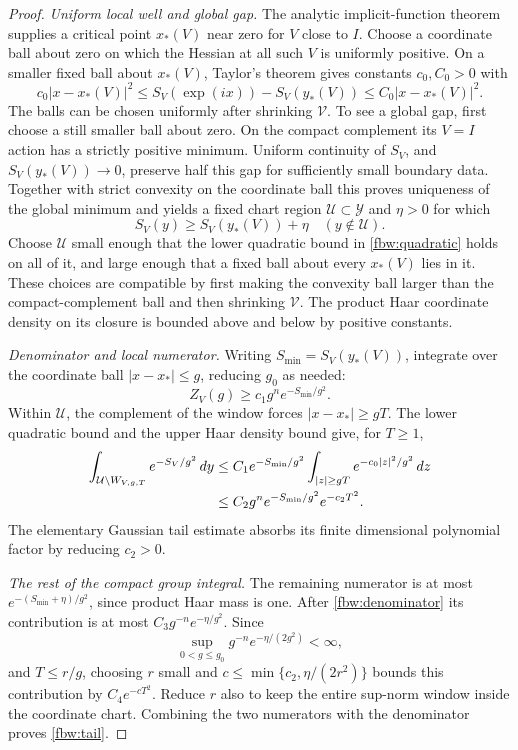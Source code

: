 \begin{proof}
\emph{Uniform local well and global gap.}
The analytic implicit-function theorem supplies a critical point
\(x_*(V)\) near zero for \(V\) close to \(I\). Choose a coordinate
ball about zero on which the Hessian at all such \(V\) is uniformly
positive. On a smaller fixed ball about \(x_*(V)\), Taylor's theorem
gives constants \(c_0,C_0>0\) with
\begin{equation}
 c_0|x-x_*(V)|^2\leq S_V(\exp(ix))-S_V(y_*(V))
       \leq C_0|x-x_*(V)|^2.
 \label{fbw:quadratic}
\end{equation}
The balls can be chosen uniformly after shrinking \(\mathcal V\).
To see a global gap, first choose a still smaller ball about zero.
On the compact complement its \(V=I\) action has a strictly positive
minimum. Uniform continuity of \(S_V\), and \(S_V(y_*(V))\to0\),
preserve half this gap for sufficiently small boundary data.
Together with strict convexity on the coordinate ball this proves
uniqueness of the global minimum and yields a fixed chart region
\(\mathcal U\subset\mathcal Y\) and \(\eta>0\) for which
\begin{equation}
 S_V(y)\geq S_V(y_*(V))+\eta\quad(y\notin\mathcal U).
 \label{fbw:gap}
\end{equation}
Choose \(\mathcal U\) small enough that the lower quadratic bound in
\eqref{fbw:quadratic} holds on all of it, and large enough that a
fixed ball about every \(x_*(V)\) lies in it. These choices are
compatible by first making the convexity ball larger than the
compact-complement ball and then shrinking \(\mathcal V\).
The product Haar coordinate density on its closure is bounded above
and below by positive constants.

\emph{Denominator and local numerator.}
Writing \(S_{\min}=S_V(y_*(V))\), integrate over the coordinate
ball \(|x-x_*|\leq g\), reducing \(g_0\) as needed:
\begin{equation}
 Z_V(g)\geq c_1 g^n e^{-S_{\min}/g^2}.
 \label{fbw:denominator}
\end{equation}
Within \(\mathcal U\), the complement of the window forces
\(|x-x_*|\geq gT\). The lower quadratic bound and the upper Haar
density bound give, for \(T\geq1\),
\begin{align}
 \int_{\mathcal U\setminus W_{V,g,T}}e^{-S_V/g^2}\,dy
 &\leq C_1 e^{-S_{\min}/g^2}
       \int_{|z|\geq gT}e^{-c_0|z|^2/g^2}\,dz \notag\\
 &\leq C_2 g^n e^{-S_{\min}/g^2}e^{-c_2T^2}.
 \label{fbw:localnumerator}
\end{align}
The elementary Gaussian tail estimate absorbs its finite dimensional
polynomial factor by reducing \(c_2>0\).

\emph{The rest of the compact group integral.}
The remaining numerator is at most
\(e^{-(S_{\min}+\eta)/g^2}\), since product Haar mass is one.
After \eqref{fbw:denominator} its contribution is at most
\(C_3g^{-n}e^{-\eta/g^2}\). Since
\[
 \sup_{0<g\leq g_0}g^{-n}e^{-\eta/(2g^2)}<\infty,
\]
and \(T\leq r/g\), choosing \(r\) small and
\(c\leq \min\{c_2,\eta/(2r^2)\}\) bounds this contribution by
\(C_4e^{-cT^2}\). Reduce \(r\) also to keep the entire sup-norm
window inside the coordinate chart. Combining the two numerators
with the denominator proves \eqref{fbw:tail}.
\end{proof}

